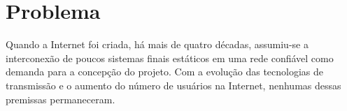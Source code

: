 \documentclass[	12pt, Times, openright, twoside, a4paper, english, brazil]{abntex2}
\begin{document}
\section{Problema}


\par Quando a Internet foi criada, há mais de quatro décadas, assumiu-se a interconexão de poucos sistemas finais estáticos em uma rede confiável como demanda para a concepção do projeto. Com a evolução das tecnologias de transmissão e o aumento do número de usuários na Internet, nenhumas dessas premissas permaneceram.
\end{document}
